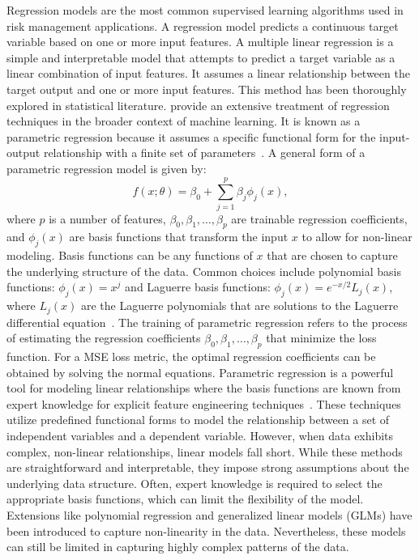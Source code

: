 Regression models are the most common supervised learning algorithms used in risk management applications.
A regression model predicts a continuous target variable based on one or more input features.
A multiple linear regression is a simple and interpretable model that attempts to predict a target variable as a linear combination of input features. 
It assumes a linear relationship between the target output and one or more input features. 
This method has been thoroughly explored in statistical literature. 
\citet{bishop2006pattern} provide an extensive treatment of regression techniques in the broader context of machine learning.
It is known as a parametric regression because it assumes a specific functional form for the input-output relationship with a finite set of parameters~\citep{seber2012linear}.
A general form of a parametric regression model is given by:
\begin{equation} \label{eq:regression}
    f(x; \theta) = \beta_0 + \sum_{j=1}^{p} \beta_j \phi_j(x),
\end{equation}
where $p$ is a number of features, $\beta_0, \beta_1, \ldots, \beta_p$ are trainable regression coefficients, and $\phi_j(x)$ are basis functions that transform the input $x$ to allow for non-linear modeling.
Basis functions can be any functions of $x$ that are chosen to capture the underlying structure of the data.
Common choices include polynomial basis functions: $\phi_j(x) = x^j$ and Laguerre basis functions: $\phi_j(x) = e^{-x/2} L_j(x)$, where $L_j(x)$ are the Laguerre polynomials that are solutions to the Laguerre differential equation~\citep{szeg1939orthogonal}.
The training of parametric regression refers to the process of estimating the regression coefficients $\beta_0, \beta_1, \ldots, \beta_p$ that minimize the loss function.
For a MSE loss metric, the optimal regression coefficients can be obtained by solving the normal equations.
Parametric regression is a powerful tool for modeling linear relationships where the basis functions are known from expert knowledge for explicit feature engineering techniques~\citep{hastie2009elements}.
These techniques utilize predefined functional forms to model the relationship between a set of independent variables and a dependent variable. 
However, when data exhibits complex, non-linear relationships, linear models fall short. 
While these methods are straightforward and interpretable, they impose strong assumptions about the underlying data structure.
Often, expert knowledge is required to select the appropriate basis functions, which can limit the flexibility of the model.
Extensions like polynomial regression and generalized linear models (GLMs) have been introduced to capture non-linearity in the data.
Nevertheless, these models can still be limited in capturing highly complex patterns of the data. 

